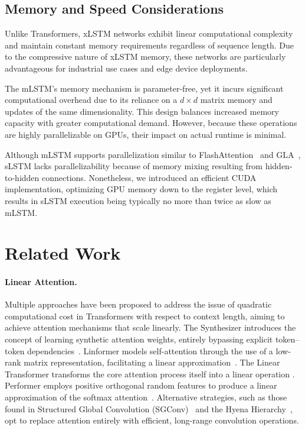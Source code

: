 \subsection{Memory and Speed Considerations}

Unlike Transformers, xLSTM networks exhibit linear computational complexity and maintain constant memory requirements regardless of sequence length. Due to the compressive nature of xLSTM memory, these networks are particularly advantageous for industrial use cases and edge device deployments.

The mLSTM’s memory mechanism is parameter-free, yet it incurs significant computational overhead due to its reliance on a $d \times d$ matrix memory and updates of the same dimensionality. This design balances increased memory capacity with greater computational demand. However, because these operations are highly parallelizable on GPUs, their impact on actual runtime is minimal.

Although mLSTM supports parallelization similar to FlashAttention~\citep{Dao:22,Dao:23} and GLA~\citep{Yang:23arxiv}, sLSTM lacks parallelizability because of memory mixing resulting from hidden-to-hidden connections. Nonetheless, we introduced an efficient CUDA implementation, optimizing GPU memory down to the register level, which results in sLSTM execution being typically no more than twice as slow as mLSTM.

\section{Related Work}
\label{sec:related}

\paragraph{Linear Attention.} Multiple approaches have been proposed to address the issue of quadratic computational cost in Transformers with respect to context length, aiming to achieve attention mechanisms that scale linearly. The Synthesizer introduces the concept of learning synthetic attention weights, entirely bypassing explicit token--token dependencies~\citep{Tay:20arxiv}. Linformer models self-attention through the use of a low-rank matrix representation, facilitating a linear approximation~\citep{Wang:20arxiv}. The Linear Transformer transforms the core attention process itself into a linear operation \citep{Katharopoulos:20}. Performer employs positive orthogonal random features to produce a linear approximation of the softmax attention~\citep{Choromanski:21}. Alternative strategies, such as those found in Structured Global Convolution (SGConv)~\citep{Li:22} and the Hyena Hierarchy~\citep{Poli:23}, opt to replace attention entirely with efficient, long-range convolution operations.

